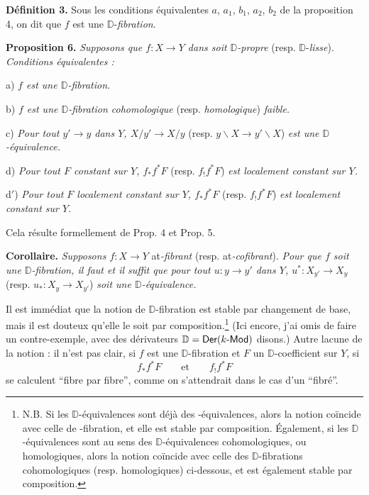 \documentclass[11pt,leqno]{article}
\newcommand{\printedpage}[1]{\marginpar{\footnotesize p.~#1}}
\newcommand{\msp}[1]{\marginpar{\footnotesize [#1]}}
\newcommand{\Dia}{\mathsf{Dia}}
\newcommand{\Hot}{\mathsf{Hot}}
\newcommand{\D}{\mathbb{D}}
\newcommand{\Cat}{\mathcal{C}at}
\newcommand{\sfup}[1]{\textsf{\upshape #1}}
\begin{document}
\textbf{Définition 3.} Sous les conditions équivalentes $a$, $a_1$, $b_1$, $a_2$, $b_2$ de la proposition 4, on dit que $f$ est une $\D$-\textit{fibration}. %

\msp{page 118}\textbf{Proposition 6.} \textit{Supposons que $f : X \to Y$ dans \Dia{} soit $\D$-propre} (resp. $\D$-\textit{lisse}). \textit{Conditions équivalentes :}

a) \textit{$f$ est une $\D$-fibration.}

b) \textit{$f$ est une $\D$-fibration cohomologique} (resp. \textit{homologique}) \textit{faible.}

c) \textit{Pour tout $y' \to y$ dans $Y$, $X/y' \to X/y$} (resp. $y\backslash X \to y'\backslash X$) \textit{est une $\D$-équivalence.}

d) \textit{Pour tout $F$ constant sur $Y$, $f_*f^*F$} (resp. $f_!f^*F$) \textit{est localement constant sur $Y$.}

d$'$) \textit{Pour tout $F$ localement constant sur $Y$, $f_*f^*F$} (resp. $f_!f^*F$) \textit{est localement constant sur $Y$.}

Cela résulte formellement de Prop. 4 et Prop. 5.

\textbf{Corollaire.} \textit{Supposons $f : X \to Y$} \Cat\textit{-fibrant} (resp. \Cat\textit{-cofibrant}). \textit{Pour que $f$ soit une $\D$-fibration, il faut et il suffit que pour tout $u : y \to y'$ dans $Y$, $u^* : X_{y'} \to X_y$} (resp. $u_* : X_y \to X_{y'}$) \textit{soit une $\D$-équivalence.}

Il est immédiat que la notion de $\D$-fibration est stable par changement de base, mais il est douteux qu'elle le soit par composition.\footnote{N.B. Si les $\D$-équivalences sont déjà des \Hot-équivalences, alors la notion coïncide avec celle de \Hot-fibration, et elle est stable par composition. Également, si les $\D$-équivalences sont au sens des $\D$-équivalences cohomologiques, ou homologiques, alors la notion coïncide avec celle des $\D$-fibrations cohomologiques (resp. homologiques) ci-dessous, et est également stable par composition.} (Ici encore, j'ai omis de faire un contre-exemple, avec des dérivateurs $\D = \sfup{Der}(k\text{-}\sfup{Mod})$ disons.) Autre lacune de la notion : il n'est pas clair, si $f$ est une $\D$-fibration et $F$ un $\D$-coefficient sur $Y$, si
\[
f_*f^*F \qquad \text{et} \qquad f_!f^*F
\]
\printedpage{71}
se calculent “fibre par fibre”, comme on s'attendrait dans le cas d'un “fibré”.
\end{document}

